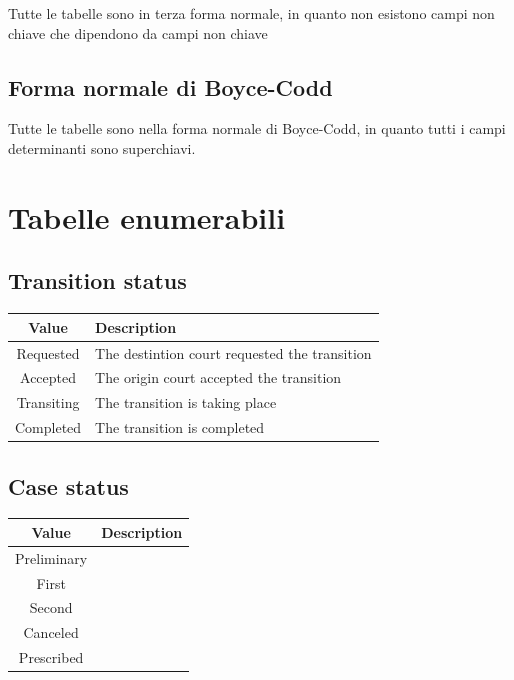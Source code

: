 \documentclass{article}
\begin{document}
{Tutte le tabelle sono in terza forma normale, in quanto non esistono campi non chiave
che dipendono da campi non chiave

\subsection{Forma normale di Boyce-Codd}

Tutte le tabelle sono nella forma normale di Boyce-Codd, in quanto tutti i
campi determinanti sono superchiavi.

\section{Tabelle enumerabili}

\subsection{Transition status}
\begin{table}[h]
    \begin{center}
        \begin{tabular}{c|l}
            \toprule
            \textbf{Value} &
            \textbf{Description}                                           \\
            \midrule
            Requested      & The destintion court requested the transition \\
            Accepted       & The origin court accepted the transition      \\
            Transiting     & The transition is taking place                \\
            Completed      & The transition is completed                   \\
            \bottomrule
        \end{tabular}
    \end{center}
\end{table}

\subsection{Case status}
\begin{table}[h]
    \begin{center}
        \begin{tabular}{c|l}
            \toprule
            \textbf{Value} &
            \textbf{Description} \\
            \midrule
            Preliminary    &     \\
            First          &     \\
            Second         &     \\
            Canceled       &     \\
            Prescribed     &     \\
            \bottomrule
        \end{tabular}
    \end{center}
\end{table}

}
\end{document}
